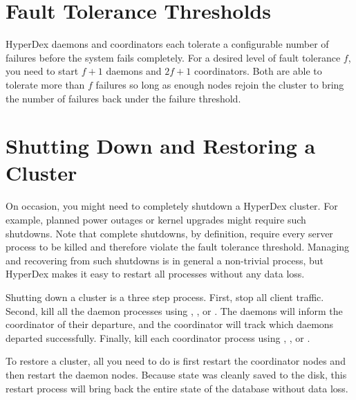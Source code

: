 \section{Fault Tolerance Thresholds}
\label{chap:fault-tolerance:thresholds}

HyperDex daemons and coordinators each tolerate a configurable number of
failures before the system fails completely.  For a desired level of fault
tolerance $f$, you need to start $f + 1$ daemons and $2 f + 1$ coordinators.
Both are able to tolerate more than $f$ failures so long as enough nodes rejoin
the cluster to bring the number of failures back under the failure threshold.

\section{Shutting Down and Restoring a Cluster}
\label{chap:fault-tolerance:reboot}

On occasion, you might need to completely shutdown a HyperDex cluster.  For
example, planned power outages or kernel upgrades might require such shutdowns.
Note that complete shutdowns, by definition, require every server process to be
killed and therefore violate the fault tolerance threshold.  Managing and
recovering from such shutdowns is in general a non-trivial process, but HyperDex
makes it easy to restart all processes without any data loss.

Shutting down a cluster is a three step process.  First, stop all client
traffic.  Second, kill all the daemon processes using ,
, or .  The daemons will inform the coordinator of
their departure, and the coordinator will track which daemons departed
successfully.  Finally, kill each coordinator process using ,
, or .

To restore a cluster, all you need to do is first restart the coordinator nodes
and then restart the daemon nodes.  Because state was cleanly saved to the disk,
this restart process will bring back the entire state of the database without
data loss.
